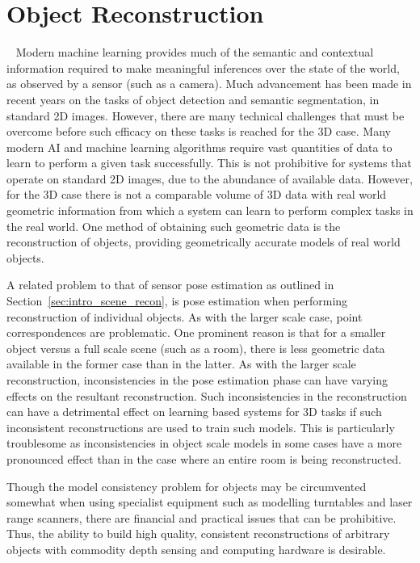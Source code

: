 \section{Object Reconstruction}
~\label{sec:intro_object_recon}
Modern machine learning provides much of the semantic and contextual information required to make meaningful 
inferences over the state of the world, as observed by a sensor (such as a camera). Much advancement 
has been made in recent years on the tasks of object detection and semantic segmentation, in standard 2D 
images. However, there are many technical challenges that must be overcome before such efficacy on these 
tasks is reached for the 3D case. Many modern AI and machine learning algorithms require vast quantities of 
data to learn to perform a given task successfully. This is not prohibitive for systems that operate on standard 
2D images, due to the abundance of available data. However, for the 3D case there is not a comparable volume of 
3D data with real world geometric information from which a system can learn to perform complex tasks in the real 
world. One method of obtaining such geometric data is the reconstruction of objects, providing geometrically 
accurate models of real world objects.

A related problem to that of sensor pose estimation as outlined in Section~\ref{sec:intro_scene_recon}, 
is pose estimation when performing reconstruction of individual objects. As with the larger scale case, point 
correspondences are problematic. One prominent reason is that for a smaller object versus a full scale scene 
(such as a room), there is less geometric data available in the former case than in the latter. As with the larger 
scale reconstruction, inconsistencies in the pose estimation phase can have varying effects on the resultant 
reconstruction. Such inconsistencies in the reconstruction can have a detrimental effect on learning based systems 
for 3D tasks if such inconsistent reconstructions are used to train such models. This is particularly troublesome as 
inconsistencies in object scale models in some cases have a more pronounced effect than in the case where 
an entire room is being reconstructed.

Though the model consistency problem for objects may be circumvented somewhat when using specialist equipment 
such as modelling turntables and laser range scanners, there are financial and practical issues that can be 
prohibitive. Thus, the ability to build high quality, consistent reconstructions of arbitrary objects with 
commodity depth sensing and computing hardware is desirable.

